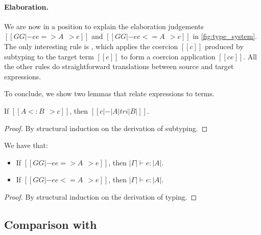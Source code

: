 \paragraph{Elaboration.}
\begin{comment}
The subtyping judgement in \cref{fig:subtype_decl} has the form $[[A <: B ~~>
c]]$, which says that the subtyping
derivation of $[[A <: B]]$ produces a coercion $[[c]]$ that is used to convert a
term of type $[[ |A| ]]$ to type $[[ |B| ]]$. Each
subtyping rule has its own specific form of coercion.
\end{comment}
We are now in a position to explain the elaboration judgements $[[GG |- ee
=> A ~~> e]]$ and $[[GG |- ee <= A ~~> e]]$ in \cref{fig:type_system}. The only
interesting rule is , which applies the coercion $[[c]]$ produced by
subtyping to the target term $[[e]]$ to form a coercion application
$[[c e]]$. All the other rules do straightforward translations between
source and target expressions.


To conclude, we show two lemmas that relate \namee expressions
to \tname terms.

\begin{lemma}
  If $[[A <: B ~~> c]]$, then $[[c |-  |A| tri |B|]]$.
  \label{lemma:sub-correct}
\end{lemma}
\begin{proof}
  By structural induction on the derivation of subtyping.
\end{proof}


\begin{lemma} We have that:
  \begin{itemize}
  \item If $[[GG |- ee => A ~~> e]]$, then $|\Gamma| \vdash e : |A| $.
  \item If $[[GG |- ee <= A ~~> e]]$, then $|\Gamma| \vdash e : |A| $.
  \end{itemize}
\end{lemma}
\begin{proof}
  By structural induction on the derivation of typing.
\end{proof}

\subsection{Comparison with \oname}
\label{sec:comparision}

